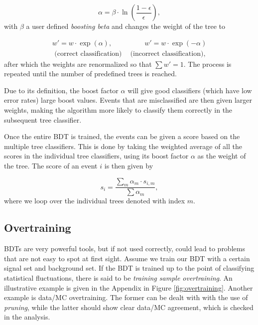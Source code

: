\begin{equation}
\label{eq:boostfactor}
\alpha = \beta \cdot \ln\left(\frac{1-\epsilon}{\epsilon}\right),
\end{equation}
\noindent with $\beta$ a user defined \textit{boosting beta} and changes the weight of the tree to

\begin{equation}
\begin{split}
w' = w \cdot \exp(\alpha), \ \ \ \ \ \ \ \ \ \ \ \ \ \ \ \ \ \ \ \ \ w' = w \cdot \exp(-\alpha)\\
\textrm{ (correct classification)} \ \ \ \ \textrm{ (incorrect classification),}
\end{split}
\end{equation}
\noindent after which the weights are renormalized so that $\sum w' = 1$. The process is repeated until the number of predefined trees is reached.

Due to its definition, the boost factor $\alpha$ will give good classifiers (which have low error rates) large boost values. Events that are misclassified are then given larger weights, making the algorithm more likely to classify them correctly in the subsequent tree classifier.

Once the entire BDT is trained, the events can be given a score based on the multiple tree classifiers. This is done by taking the weighted average of all the scores in the individual tree classifiers, using its boost factor $\alpha$ as the weight of the tree. The score of an event $i$ is then given by

\begin{equation}
s_i = \frac{\sum_m \alpha_m \cdot s_{i,m}}{\sum \alpha_m},
\end{equation}
\noindent where we loop over the individual trees denoted with index $m$.

\subsection{Overtraining}
\label{subsec:overtraining}
BDTs are very powerful tools, but if not used correctly, could lead to problems that are not easy to spot at first sight. Assume we train our BDT with a certain signal set and background set. If the BDT is trained up to the point of classifying statistical fluctuations, there is said to be \textit{training sample overtraining}. An illustrative example is given in the Appendix in Figure \ref{fig:overtraining}. Another example is data/MC overtraining. The former can be dealt with with the use of \textit{pruning}, while the latter should show clear data/MC agreement, which is checked in the analysis. 

